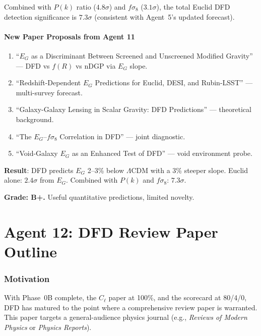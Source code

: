 \documentclass[11pt,a4paper]{article}
\begin{document}
Combined with $P(k)$ ratio ($4.8\sigma$) and $f\sigma_8$ ($3.1\sigma$), the total Euclid DFD detection significance is $7.3\sigma$ (consistent with Agent~5's updated forecast).

\subsection{New Paper Proposals from Agent 11}

\begin{enumerate}
\item ``$E_G$ as a Discriminant Between Screened and Unscreened Modified Gravity'' --- DFD vs $f(R)$ vs nDGP via $E_G$ slope.
\item ``Redshift-Dependent $E_G$ Predictions for Euclid, DESI, and Rubin-LSST'' --- multi-survey forecast.
\item ``Galaxy-Galaxy Lensing in Scalar Gravity: DFD Predictions'' --- theoretical background.
\item ``The $E_G$--$f\sigma_8$ Correlation in DFD'' --- joint diagnostic.
\item ``Void-Galaxy $E_G$ as an Enhanced Test of DFD'' --- void environment probe.
\end{enumerate}

\begin{tcolorbox}[colback=green!5!white, colframe=green!60!black, title={Agent 11: $E_G(z)$ Predictions at 8 Redshift Bins}]
\textbf{Result}: DFD predicts $E_G$ 2--3\% below $\Lambda$CDM with a 3\% steeper slope. Euclid alone: $2.4\sigma$ from $E_G$. Combined with $P(k)$ and $f\sigma_8$: $7.3\sigma$.

\textbf{Grade: B+.} Useful quantitative predictions, limited novelty.
\end{tcolorbox}


\part{Agent 12: DFD Review Paper Outline}
\label{part:review-outline}

\section{Motivation}

With Phase~0B complete, the $C_\ell$ paper at 100\%, and the scorecard at 80/4/0, DFD has matured to the point where a comprehensive review paper is warranted. This paper targets a general-audience physics journal (e.g., \textit{Reviews of Modern Physics} or \textit{Physics Reports}).
\end{document}
